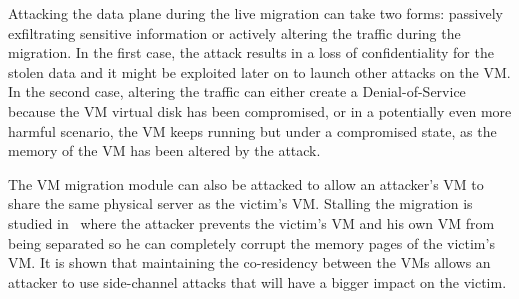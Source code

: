 Attacking the data plane during the live migration can take two forms: passively exfiltrating sensitive information or actively altering the traffic during the migration.
In the first case, the attack results in a loss of confidentiality for the stolen data and it might be exploited later on to launch other attacks on the VM.
In the second case, altering the traffic can either create a Denial-of-Service because the VM virtual disk has been compromised, or in a potentially even more harmful scenario, the VM keeps running but under a compromised state, as the memory of the VM has been altered by the attack.

The VM migration module can also be attacked to allow an attacker's VM to share the same physical server as the victim's VM. Stalling the migration is studied in~\cite{stalling-atya2017} where the attacker prevents the victim's VM and his own VM from being separated so he can completely corrupt the memory pages of the victim's VM. It is shown that maintaining the co-residency between the VMs allows an attacker to use side-channel attacks that will have a bigger impact on the victim.


